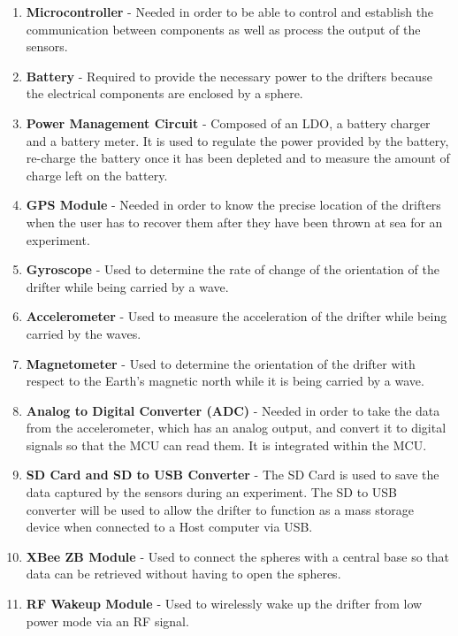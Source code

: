 \begin{enumerate}
\item \textbf{Microcontroller} -  Needed in order to be able to control and establish the communication between components as well as process the output of the sensors.

\item \textbf{Battery} - Required to provide the necessary power to the drifters because the electrical components are enclosed by a sphere.

\item \textbf{Power Management Circuit} - Composed of an LDO, a battery charger and a battery meter.  It is used to regulate the power provided by the battery, re-charge the battery once it has been depleted and to measure the amount of charge left on the battery.

\item \textbf{GPS Module} - Needed in order to know the precise location of the drifters when the user has to recover them after they have been thrown at sea for an experiment.

\item \textbf{Gyroscope} - Used to determine the rate of change of the orientation of the drifter while being carried by a wave.

\item \textbf{Accelerometer} - Used to measure the acceleration of the drifter while being carried by the waves.

\item \textbf{Magnetometer} - Used to determine the orientation of the drifter with respect to the Earth's magnetic north while it is being carried by a wave.

\item \textbf{Analog to Digital Converter (ADC)} - Needed in order to take the data from the accelerometer, which has an analog output, and convert it to digital signals so that the MCU can read them.  It is integrated within the MCU.

\item \textbf{SD Card and SD to USB Converter} - The SD Card is used to save the data captured by the sensors during an experiment.  The SD to USB converter will be used to allow the drifter to function as a mass storage device when connected to a Host computer via USB.

\item \textbf{XBee ZB Module} - Used to connect the spheres with a central base so that data can be retrieved without having to open the spheres.


\item \textbf{RF Wakeup Module} - Used to wirelessly wake up the drifter from low power mode via an RF signal.

\end{enumerate}

